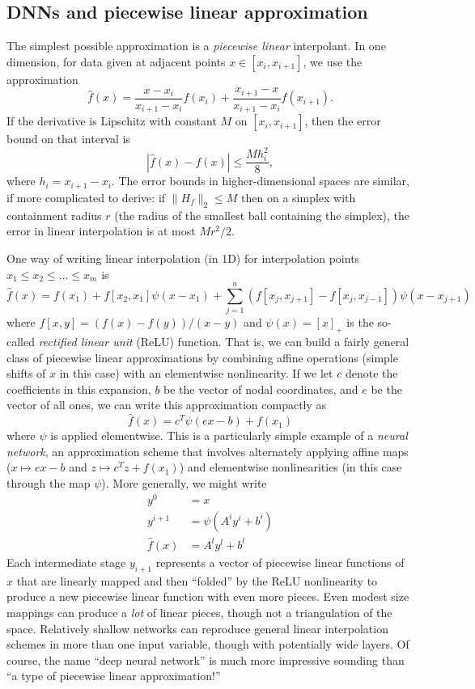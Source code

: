 \documentclass[12pt, leqno]{article} %
\begin{document}
\subsection{DNNs and piecewise linear approximation}

The simplest possible approximation is a {\em piecewise linear}
interpolant.  In one dimension, for data given at adjacent points
$x \in [x_i, x_{i+1}]$, we use the approximation
\[
  \hat{f}(x) =
  \frac{x-x_i}{x_{i+1}-x_i} f(x_i) + \frac{x_{i+1}-x}{x_{i+1}-x_i} f(x_{i+1}).
\]
If the derivative is Lipschitz with constant $M$ on $[x_i, x_{i+1}]$,
then the error bound on that interval is
\[
  |\hat{f}(x)-f(x)| \leq \frac{Mh_i^2}{8},
\]
where $h_i = x_{i+1}-x_i$.  The error bounds in higher-dimensional
spaces are similar, if more complicated to derive: if
$\|H_f\|_2 \leq M$ then on a simplex with containment radius $r$
(the radius of the smallest ball containing the simplex), the error in linear
interpolation is at most $Mr^2/2$.

One way of writing linear interpolation (in 1D) for interpolation
points $x_1 \leq x_2 \leq \ldots \leq x_m$ is
\[
\hat{f}(x) =
f(x_1) + f[x_2,x_1] \psi(x-x_1) +
  \sum_{j=1}^n (f[x_j,x_{j+1}]-f[x_j,x_{j-1}]) \psi(x-x_{j+1})
\]
where $f[x,y] = (f(x)-f(y))/(x-y)$ and $\psi(x) = [x]_+$ is the
so-called {\em rectified linear unit} (ReLU) function.  That is, we
can build a fairly general class of piecewise linear approximations
by combining affine operations (simple shifts of $x$ in this case)
with an elementwise nonlinearity.  If we let $c$ denote the
coefficients in this expansion, $b$ be the vector of nodal
coordinates, and $e$ be the vector of all ones, we can write this
approximation compactly as
\[
  \hat{f}(x) = c^T \psi(ex-b) + f(x_1)
\]
where $\psi$ is applied elementwise.  This is a particularly simple
example of a {\em neural network}, an approximation scheme that
involves alternately applying affine maps ($x \mapsto ex-b$ and
$z \mapsto c^T z + f(x_1)$) and elementwise nonlinearities (in this
case through the map $\psi$).  More generally, we might write
\begin{align*}
  y^0 &= x \\
  y^{i+1} &= \psi(A^i y^i + b^i) \\
  \hat{f}(x) &= A^{l} y^l + b^l
\end{align*}
Each intermediate stage $y_{i+1}$ represents a vector of piecewise
linear functions of $x$ that are linearly mapped and then ``folded''
by the ReLU nonlinearity to produce a new piecewise linear function
with even more pieces.  Even modest size mappings can produce a
{\em lot} of linear pieces, though not a triangulation of the space.
Relatively shallow networks can reproduce general linear interpolation
schemes in more than one input variable, though with potentially wide
layers.  Of course, the name ``deep neural network'' is much more
impressive sounding than ``a type of piecewise linear approximation!''
\end{document}

